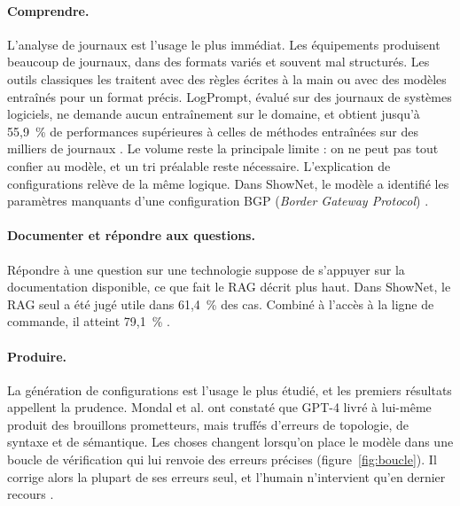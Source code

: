 \paragraph{Comprendre.}
L'analyse de journaux est l'usage le plus immédiat. Les équipements produisent beaucoup de journaux, dans des formats variés et souvent mal structurés. Les outils classiques les traitent avec des règles écrites à la main ou avec des modèles entraînés pour un format précis. LogPrompt, évalué sur des journaux de systèmes logiciels, ne demande aucun entraînement sur le domaine, et obtient jusqu'à 55,9~\% de performances supérieures à celles de méthodes entraînées sur des milliers de journaux \cite{liu2024}. Le volume reste la principale limite : on ne peut pas tout confier au modèle, et un tri préalable reste nécessaire. L'explication de configurations relève de la même logique. Dans ShowNet, le modèle a identifié les paramètres manquants d'une configuration BGP (\emph{Border Gateway Protocol}) \cite{nakamura2026}.

\paragraph{Documenter et répondre aux questions.}
Répondre à une question sur une technologie suppose de s'appuyer sur la documentation disponible, ce que fait le RAG décrit plus haut. Dans ShowNet, le RAG seul a été jugé utile dans 61,4~\% des cas. Combiné à l'accès à la ligne de commande, il atteint 79,1~\% \cite{nakamura2026}.

\paragraph{Produire.}
La génération de configurations est l'usage le plus étudié, et les premiers résultats appellent la prudence. Mondal et al. ont constaté que GPT-4 livré à lui-même produit des brouillons prometteurs, mais truffés d'erreurs de topologie, de syntaxe et de sémantique. Les choses changent lorsqu'on place le modèle dans une boucle de vérification qui lui renvoie des erreurs précises (figure~\ref{fig:boucle}). Il corrige alors la plupart de ses erreurs seul, et l'humain n'intervient qu'en dernier recours \cite{mondal2023}.

